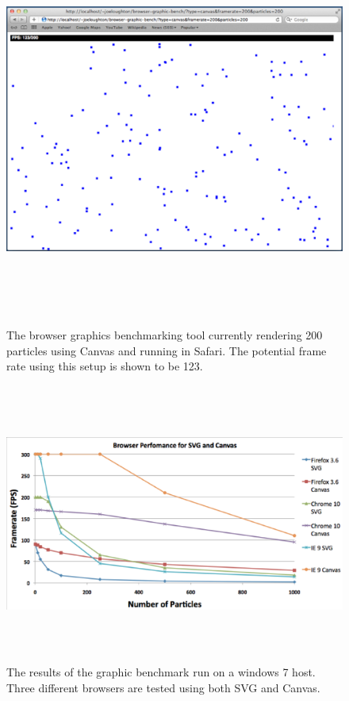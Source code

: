 \documentclass[11pt, a4paper]{article}
\begin{document}
\begin{figure}
\centering
\includegraphics[width=170mm,height=130.08mm]{assets/benchmark-tool.eps}
\caption{The browser graphics benchmarking tool currently rendering 200
particles using Canvas and running in Safari. The potential frame rate using
this setup is shown to be 123.}
\label{fig:benchmark-tool}
\end{figure}

\begin{figure}
\centering
\includegraphics[width=170mm,height=91.67mm]{assets/benchmark-graph.eps}
\caption{The results of the graphic benchmark run on a windows 7 host. Three
different browsers are tested using both SVG and Canvas.}
\label{fig:benchmark-graph}
\end{figure}
\end{document}
